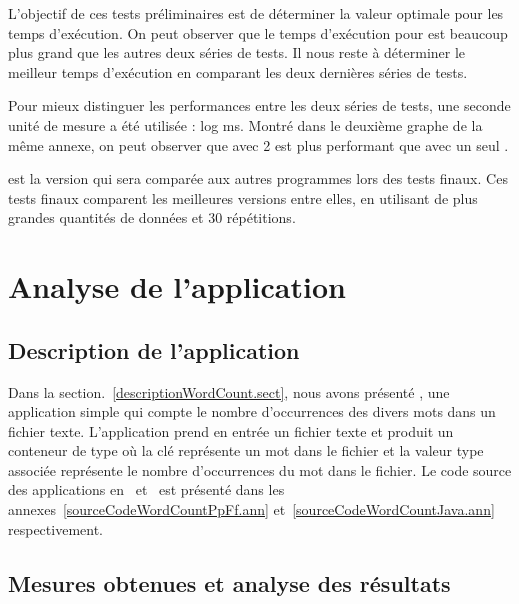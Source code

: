 L'objectif de ces tests pr\'eliminaires est de d\'eterminer la valeur optimale pour les temps d'ex\'ecution. On peut observer que le temps d'ex\'ecution pour  est beaucoup plus grand que les autres deux s\'eries de tests. Il nous reste \`a d\'eterminer le meilleur temps d'ex\'ecution en comparant les deux derni\`eres s\'eries de tests.

Pour mieux distinguer les performances entre les deux s\'eries de tests, une seconde unit\'e de mesure a \'et\'e utilis\'ee : log ms. Montr\'e dans le deuxi\`eme graphe de la m\^eme annexe, on peut observer que  avec 2  est plus performant que  avec un seul . 

 est la version qui sera compar\'ee aux autres programmes lors des tests finaux. Ces tests finaux comparent les meilleures versions entre elles, en utilisant de plus grandes quantit\'es de donn\'ees et 30 r\'ep\'etitions.


\section{Analyse de l'application }
\label{wordcount.sect}



\subsection{Description de l'application }


Dans la section.~\ref{descriptionWordCount.sect}, nous avons pr\'esent\'e , une application simple qui compte le nombre d'occurrences des divers mots dans un fichier texte. L'application prend en entr\'ee un fichier texte et produit un conteneur de type  où la cl\'e repr\'esente un mot dans le fichier et la valeur  type   associ\'ee repr\'esente le nombre d'occurrences du mot dans le fichier. Le code source des applications  en~ et~ est pr\'esent\'e dans les annexes~\ref{sourceCodeWordCountPpFf.ann} et~\ref{sourceCodeWordCountJava.ann} respectivement.


\subsection{Mesures obtenues et analyse des r\'esultats}


